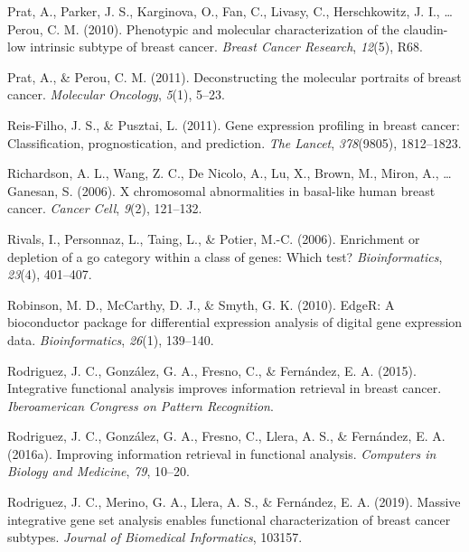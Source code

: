 \documentclass[12pt,twoside]{reedthesis}
\begin{document}
\leavevmode\hypertarget{ref-prat2010phenotypic}{}%
Prat, A., Parker, J. S., Karginova, O., Fan, C., Livasy, C., Herschkowitz, J. I., \ldots{} Perou, C. M. (2010). Phenotypic and molecular characterization of the claudin-low intrinsic subtype of breast cancer. \emph{Breast Cancer Research}, \emph{12}(5), R68.

\leavevmode\hypertarget{ref-prat2011deconstructing}{}%
Prat, A., \& Perou, C. M. (2011). Deconstructing the molecular portraits of breast cancer. \emph{Molecular Oncology}, \emph{5}(1), 5--23.

\leavevmode\hypertarget{ref-reis2011gene}{}%
Reis-Filho, J. S., \& Pusztai, L. (2011). Gene expression profiling in breast cancer: Classification, prognostication, and prediction. \emph{The Lancet}, \emph{378}(9805), 1812--1823.

\leavevmode\hypertarget{ref-richardson2006x}{}%
Richardson, A. L., Wang, Z. C., De Nicolo, A., Lu, X., Brown, M., Miron, A., \ldots{} Ganesan, S. (2006). X chromosomal abnormalities in basal-like human breast cancer. \emph{Cancer Cell}, \emph{9}(2), 121--132.

\leavevmode\hypertarget{ref-rivals2006enrichment}{}%
Rivals, I., Personnaz, L., Taing, L., \& Potier, M.-C. (2006). Enrichment or depletion of a go category within a class of genes: Which test? \emph{Bioinformatics}, \emph{23}(4), 401--407.

\leavevmode\hypertarget{ref-robinson2010edger}{}%
Robinson, M. D., McCarthy, D. J., \& Smyth, G. K. (2010). EdgeR: A bioconductor package for differential expression analysis of digital gene expression data. \emph{Bioinformatics}, \emph{26}(1), 139--140.

\leavevmode\hypertarget{ref-rodriguezciarp}{}%
Rodriguez, J. C., González, G. A., Fresno, C., \& Fernández, E. A. (2015). Integrative functional analysis improves information retrieval in breast cancer. \emph{Iberoamerican Congress on Pattern Recognition}.

\leavevmode\hypertarget{ref-rodriguez2016improving}{}%
Rodriguez, J. C., González, G. A., Fresno, C., Llera, A. S., \& Fernández, E. A. (2016a). Improving information retrieval in functional analysis. \emph{Computers in Biology and Medicine}, \emph{79}, 10--20.

\leavevmode\hypertarget{ref-rodriguez2019massive}{}%
Rodriguez, J. C., Merino, G. A., Llera, A. S., \& Fernández, E. A. (2019). Massive integrative gene set analysis enables functional characterization of breast cancer subtypes. \emph{Journal of Biomedical Informatics}, 103157.
\end{document}

